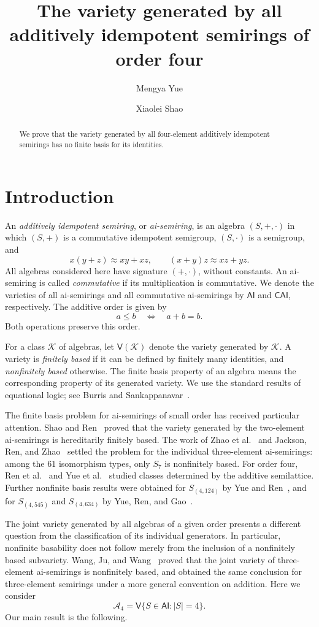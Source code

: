 \documentclass[11pt,reqno]{amsart}
\title[The joint variety of four-element ai-semirings]{The variety generated by all additively idempotent semirings of order four}
\author{Mengya Yue}
\author{Xiaolei Shao}
\date{}
\theoremstyle{remark}
\newcommand{\AI}{\mathsf{AI}}
\newcommand{\CAI}{\mathsf{CAI}}
\newcommand{\A}{\mathcal A_4}
\newcommand{\V}{\mathsf V}
\numberwithin{equation}{section}
\begin{document}
\begin{abstract}
We prove that the variety generated by all four-element additively idempotent
semirings has no finite basis for its identities. 
\end{abstract}
\maketitle

\section{Introduction}\label{sec:intro}

An \emph{additively idempotent semiring}, or \emph{ai-semiring}, is an algebra
$(S,+,\cdot)$ in which $(S,+)$ is a commutative idempotent semigroup,
$(S,\cdot)$ is a semigroup, and
\[
x(y+z)\approx xy+xz,\qquad (x+y)z\approx xz+yz.
\]
All algebras considered here have signature $(+ ,\cdot)$, without constants.
An ai-semiring is called \emph{commutative} if its multiplication is
commutative. We denote the varieties of all ai-semirings and all commutative
ai-semirings by $\AI$ and $\CAI$, respectively. The additive order is given by
\[
a\leq b\quad\Longleftrightarrow\quad a+b=b.
\]
Both operations preserve this order.

For a class $\mathcal K$ of algebras, let $\V(\mathcal K)$ denote the variety
generated by $\mathcal K$. A variety is \emph{finitely based} if it can be
defined by finitely many identities, and \emph{nonfinitely based} otherwise.
The finite basis property of an algebra means the corresponding property
of its generated variety. We use the standard results of equational logic;
see Burris and Sankappanavar~\cite{BS}.

The finite basis problem for ai-semirings of small order has received
particular attention. Shao and Ren~\cite{SR} proved that the variety
generated by the two-element ai-semirings is hereditarily finitely based.
The work of Zhao et al.~\cite{ZRCSD} and Jackson, Ren, and Zhao~\cite{JRZ}
settled the problem for the individual three-element ai-semirings: among
the $61$ isomorphism types, only $S_7$ is nonfinitely based. For order four,
Ren et al.~\cite{RLLC, RLYC} and Yue et al.~\cite{YRZS} studied classes
determined by the additive semilattice. Further nonfinite basis results
were obtained for $S_{(4,124)}$ by Yue and Ren~\cite{YR124}, and for
$S_{(4,545)}$ and $S_{(4,634)}$ by Yue, Ren, and Gao~\cite{YRG}.

The joint variety generated by all algebras of a given order presents a
different question from the classification of its individual generators.
In particular, nonfinite basability does not follow merely from the
inclusion of a nonfinitely based subvariety. Wang, Ju, and Wang~\cite{WJW}
proved that the joint variety of three-element ai-semirings is nonfinitely
based, and obtained the same conclusion for three-element semirings under
a more general convention on addition. Here we consider
\[
\A=\V\{S\in\AI:|S|=4\}.
\]
Our main result is the following.
\end{document}
